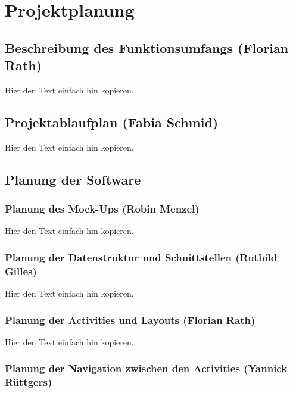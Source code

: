 \section{Projektplanung}
\label{instal}

\subsection{Beschreibung des Funktionsumfangs (Florian Rath)}

Hier den Text einfach hin kopieren.

\subsection{Projektablaufplan (Fabia Schmid)}

Hier den Text einfach hin kopieren.

\subsection{Planung der Software}

\subsubsection{Planung des Mock-Ups (Robin Menzel)}

Hier den Text einfach hin kopieren.

\subsubsection{Planung der Datenstruktur und Schnittstellen (Ruthild Gilles)}

Hier den Text einfach hin kopieren.

\subsubsection{Planung der Activities und Layouts (Florian Rath)}

Hier den Text einfach hin kopieren.

\subsubsection{Planung der Navigation zwischen den Activities (Yannick Rüttgers)}

